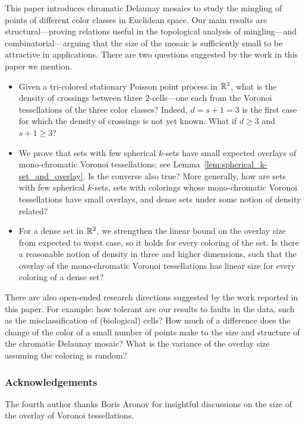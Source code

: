 \documentclass[a4paper]{article}
\newcommand {\mm}[1]   {\ifmmode{#1}\else{\mbox{\(#1\)}}\fi}
\newcommand{\Rspace}        {\mm{{\mathbb R}}}
\theoremstyle{definition}
\numberwithin{theorem}{section}
\numberwithin{equation}{section}
\begin{document}
This paper introduces chromatic Delaunay mosaics to study the mingling of points of different color classes in Euclidean space.
Our main results are structural---proving relations useful in the topological analysis of mingling---and combinatorial---arguing that the size of the mosaic is sufficiently small to be attractive in applications.
There are two questions suggested by the work in this paper we mention.
\medskip \begin{itemize}
  \item Given a tri-colored stationary Poisson point process in $\Rspace^3$, what is the density of crossings between three $2$-cells---one each from the Voronoi tessellations of the three color classes?
  Indeed, $d = s+1 = 3$ is the first case for which the density of crossings is not yet known.
  What if $d \geq 3$ and $s+1 \geq 3$?
  \item We prove that sets with few spherical $k$-sets have small expected overlays of mono-chromatic Voronoi tessellations; see Lemma~\ref{lem:spherical_k-set_and_overlay}.
  Is the converse also true?
  More generally, how are sets with few spherical $k$-sets, sets with colorings whose mono-chromatic Voronoi tessellations have small overlays, and dense sets under some notion of density related?
  \item For a dense set in $\Rspace^2$, we strengthen the linear bound on the overlay size from expected to worst case, so it holds for every coloring of the set.
  Is there a reasonable notion of density in three and higher dimensions, such that the overlay of the mono-chromatic Voronoi tessellations has linear size for every coloring of a dense set?
\end{itemize} \medskip
There are also open-ended research directions suggested by the work reported in this paper.
For example: how tolerant are our results to faults in the data, such as the misclassification of (biological) cells?
How much of a difference does the change of the color of a small number of points make to the size and structure of the chromatic Delaunay mosaic?
What is the variance of the overlay size assuming the coloring is random?

\subsubsection*{Acknowledgements}
{\footnotesize
  The fourth author thanks Boris Aronov for insightful discussions on the size of the overlay of Voronoi tessellations.}
\end{document}
